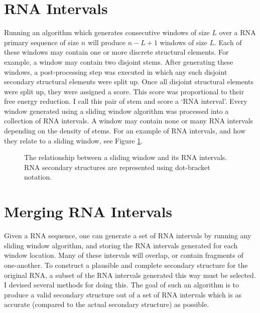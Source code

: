 \documentclass{cshonours}
\begin{document}
\section{RNA Intervals}
Running an algorithm which generates consecutive windows of size $L$ over a RNA primary sequence of size $n$ will produce $n-L+1$ windows of size $L$. Each of these windows may contain one or more discrete structural elements. For example, a window may contain two disjoint stems. After generating these windows, a post-processing step was executed in which any such disjoint secondary structural elements were split up. Once all disjoint structural elements were split up, they were assigned a score. This score was proportional to their free energy reduction. I call this pair of stem and score a `RNA interval'. Every window generated using a sliding window algorithm was processed into a collection of RNA intervals. A window may contain none or many RNA intervals depending on the density of stems. For an example of RNA intervals, and how they relate to a sliding window, see Figure \ref{fig:rnainterval}.


\begin{figure}
\begin{center}
\end{center}
\caption{The relationship between a sliding window and its RNA intervals. RNA secondary structures are represented using dot-bracket notation.}
\label{fig:rnainterval}
\end{figure}




\section{Merging RNA Intervals}
\label{sec:merging}

Given a RNA sequence, one can generate a set of RNA intervals by running any sliding window algorithm, and storing the RNA intervals generated for each window location. Many of these intervals will overlap, or contain fragments of one-another. To construct a plausible and complete secondary structure for the original RNA, a subset of the RNA intervals generated this way must be selected. I devised several methods for doing this. The goal of such an algorithm is to produce a valid secondary structure out of a set of RNA intervals which is as accurate (compared to the actual secondary structure) as possible.
\end{document}
